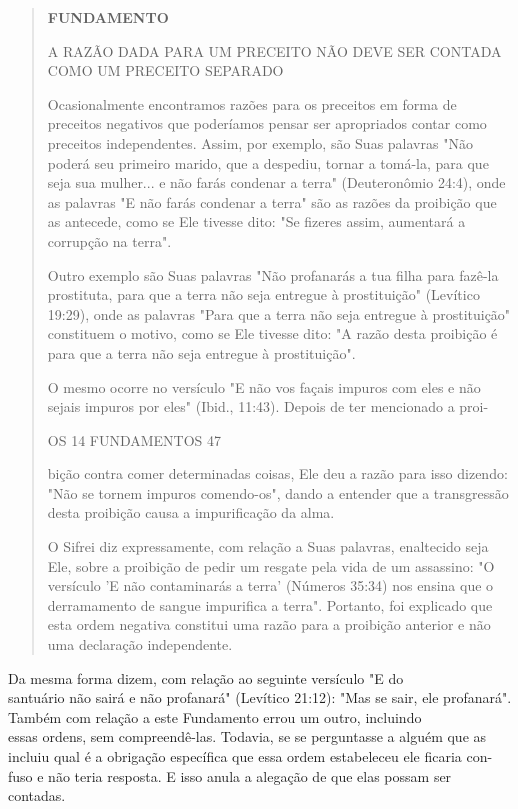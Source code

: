 \begin{quote}
\textbf{FUNDAMENTO}

A RAZÃO DADA PARA UM PRECEITO NÃO DEVE SER CONTADA COMO UM PRECEITO
SEPARADO

Ocasionalmente encontramos razões para os preceitos em forma de
preceitos negativos que poderíamos pensar ser apropriados contar como
pre­ceitos independentes. Assim, por exemplo, são Suas palavras "Não
poderá seu primeiro marido, que a despediu, tornar a tomá-la, para que
seja sua mulher... e não farás condenar a terra" (Deuteronômio 24:4),
onde as palavras "E não farás condenar a terra" são as razões da
proibição que as antecede, como se Ele tivesse dito: "Se fizeres assim,
aumentará a corrupção na terra".

Outro exemplo são Suas palavras "Não profanarás a tua filha para fazê-la
prostituta, para que a terra não seja entregue à prostituição" (Levítico
19:29), onde as palavras "Para que a terra não seja entregue à
prostituição" cons­tituem o motivo, como se Ele tivesse dito: "A razão
desta proibição é para que a terra não seja entregue à prostituição".

O mesmo ocorre no versículo "E não vos façais impuros com eles e não
sejais impuros por eles" (Ibid., 11:43). Depois de ter mencionado a
proi-

OS 14 FUNDAMENTOS 47

bição contra comer determinadas coisas, Ele deu a razão para isso
dizendo: "Não se tornem impuros comendo-os", dando a entender que a
transgressão desta proibição causa a impurificação da alma.

O Sifrei diz expressamente, com relação a Suas palavras, enaltecido seja
Ele, sobre a proibição de pedir um resgate pela vida de um assassino: "O
versículo 'E não contaminarás a terra' (Números 35:34) nos ensina que o
derra­mamento de sangue impurifica a terra". Portanto, foi explicado que
esta or­dem negativa constitui uma razão para a proibição anterior e não
uma declara­ção independente.
\end{quote}

Da mesma forma dizem, com relação ao seguinte versículo "E do\\
santuário não sairá e não profanará" (Levítico 21:12): "Mas se sair, ele
profanará".\\
Também com relação a este Fundamento errou um outro, incluindo\\
essas ordens, sem compreendê-las. Todavia, se se perguntasse a alguém
que as\\
incluiu qual é a obrigação específica que essa ordem estabeleceu ele
ficaria con-\\
fuso e não teria resposta. E isso anula a alegação de que elas possam
ser contadas.

